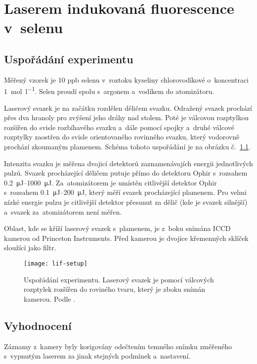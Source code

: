 \chapter[LIF]{Laserem indukovaná fluorescence v~selenu}

\providecommand\xpos{x}
\providecommand\ypos{y}
\providecommand\laser{L}
\providecommand\lif{F}
\providecommand\voigtsigma{\sigma}
\providecommand\voigtgamma{\gamma}

\section{Uspořádání experimentu}
\label{sec:lif-setup}
Měřený vzorek je 10 ppb selenu v roztoku kyseliny chlorovodíkové
o koncentraci \SI{1}{\mol\per\litre}.
Selen proudí spolu s argonem a vodíkem do atomizátoru.

Laserový svazek je na začátku rozdělen děličem svazku.
Odražený svazek prochází přes dva hranoly pro zvýšení jeho dráhy nad stolem.
Poté je válcovou rozptylkou rozšířen do svisle rozbíhavého svazku
a~dále pomocí spojky a~druhé válcové rozptylky zaostřen
do svisle orientovaného rovinného svazku,
který vodorovně prochází zkoumaným plamenem.
Schéma tohoto uspořádání je na obrázku č.~\ref{fig:lif-setup}.

Intenzita svazku je měřena dvojicí detektorů
zaznamenávajích energii jednotlivých pulzů.
Svazek procházející děličem putuje přímo do detektoru
Ophir 
s~rozsahem \SIrange{0.2}{1000}{\micro\joule}.
Za~atomizátorem je umístěn citlivější detektor
Ophir 
s~rozsahem \SIrange{0.1}{200}{\micro\joule},
který měří svazek procházející plamenem.
Pro velmi nízké energie pulzu je citlivější detektor přesunut
za dělič (kde je svazek silnější) a~svazek za~atomizátorem není měřen.

Oblast, kde se kříží laserový svazek s~plamenem, je z~boku snímána
ICCD kamerou  od Princeton Instruments.
Před kamerou je dvojice křemenných sklíček sloužící jako filtr.

\begin{figure}[htb]
	\centering
	\texttt{[image: lif-setup]}
	\caption{Uspořádání experimentu.
		Laserový svazek je pomocí válcových rozptylek rozšířen
		do roviného tvaru, který je zboku snímán kamerou.
		Podle \cite{lif-oh}.}
	\label{fig:lif-setup}
\end{figure}

\section{Vyhodnocení}
\label{sec:lif-method}
Záznamy z~kamery byly korigovány odečtením temného snímku změřeného
s~vypnutým laserem za jinak stejných podmínek a~nastavení.


